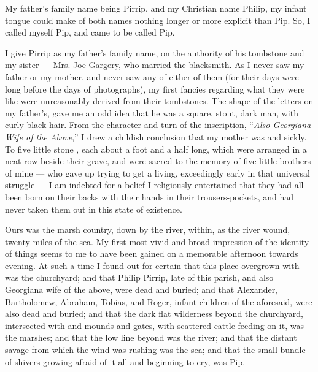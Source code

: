 \documentclass{fiche}
\begin{document}
\begin{texte}
My father's family name being Pirrip, and my Christian name Philip, my infant tongue could
make of both names nothing longer or more explicit than Pip. So, I called myself Pip, and
came to be called Pip.

I give Pirrip as my father's family name, on the authority of his tombstone and my sister
--- Mrs. Joe Gargery, who married the blacksmith. As I never saw my father or my mother, and
never saw any  of either of them (for their
days were long before the days of photographs), my first fancies regarding what they were
like were unreasonably derived from their tombstones. The shape of the letters on my
father's, gave me an odd idea that he was a square, stout, dark man, with curly black hair.
From the character and turn of the inscription, ``\emph{Also Georgiana Wife of the Above},''
I drew a childish conclusion that my mother was  and sickly. To five little stone , each about a
foot and a half long, which were arranged in a neat row beside their grave, and were sacred
to the memory of five little brothers of mine --- who gave up trying to get a living,
exceedingly early in that universal struggle --- I am indebted for a belief I religiously
entertained that they had all been born on their backs with their hands in their
trousers-pockets, and had never taken them out in this state of existence.

Ours was the marsh country, down by the river, within, as the river wound, twenty miles of
the sea. My first most vivid and broad impression of the identity of things seems to me to
have been gained on a memorable  afternoon towards
evening. At such a time I found out for certain that this 
place overgrown with  was the churchyard; and that Philip
Pirrip, late of this parish, and also Georgiana wife of the above, were dead and buried; and
that Alexander, Bartholomew, Abraham, Tobias, and Roger, infant children of the aforesaid,
were also dead and buried; and that the dark flat wilderness beyond the churchyard,
intersected with  and mounds and gates, with scattered
cattle feeding on it, was the marshes; and that the low  line
beyond was the river; and that the distant savage  from which
the wind was rushing was the sea; and that the small bundle of shivers growing afraid of it
all and beginning to cry, was Pip.


\end{texte}
\end{document}
